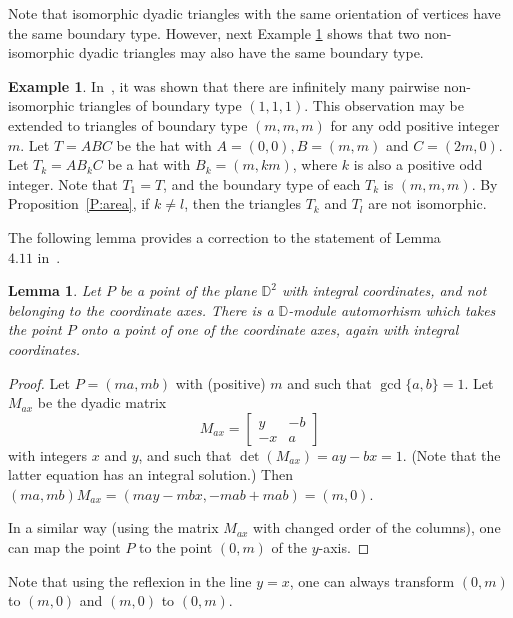 \documentclass[12pt]{amsart}
\def\mbD{\mathbb{D}}
\theoremstyle{plain}
\newtheorem{lemma}[theorem]{Lemma}
\theoremstyle{definition}
\newtheorem{example}[theorem]{Example}
\numberwithin{equation}{section}
\begin{document}
Note that isomorphic dyadic triangles with the same orientation of vertices have the same
boundary type. However, next
Example \ref{Ex:mmm0} shows that two non-isomorphic dyadic triangles may also have the same
boundary type.


\begin{example}\label{Ex:mmm0}
In~\cite[Prop.~4.7]{MRS11}, it was shown that there are infinitely many pairwise non-isomorphic
triangles of boundary type $(1,1,1)$. This observation may be extended to triangles of boundary
type $(m,m,m)$ for any odd positive integer $m$.
Let $T = ABC$ be the hat with $A = (0,0), B = (m,m)$ and $C = (2m,0)$. Let $T_k = AB_kC$ be a
hat with $B_k = (m,km)$, where $k$ is also a positive odd integer. Note that $T_1 = T$, and the
boundary type of each $T_k$ is $(m,m,m)$. By Proposition~\ref{P:area}, if $k \neq l$,
then the triangles $T_k$ and $T_l$ are not isomorphic.
\end{example}



The following lemma provides a correction to the statement of Lemma\\$4.11$ in~\cite{MRS11}.


\begin{lemma}\label{L:onaxis}
Let $P$ be a point of the plane $\mbD^2$ with integral coordinates, and not belonging to the
coordinate axes. There is a $\mbD$-module automorhism which takes the point $P$ onto a point of one of the coordinate axes, again with integral coordinates.
\end{lemma}
\begin{proof}
Let $P = (ma,mb)$ with (positive) $m$ and such that $\gcd\{a,b\} = 1$. Let $M_{ax}$ be the dyadic
matrix
\begin{equation}\label{E:Max}
M_{ax} =
\begin{bmatrix}
y & -b \\
-x & a
\end{bmatrix}
\end{equation}
with integers $x$ and $y$, and such that $ \det (M_{ax}) = ay - bx = 1$. (Note that the latter
equation has an integral solution.) Then $(ma,mb) M_{ax} = (may - mbx, -mab + mab) = (m,0)$.

In a similar way (using the matrix $M_{ax}$ with changed order of the columns), one can map the point $P$ to the point $(0,m)$ of the $y$-axis.
\end{proof}
\noindent  Note that using the reflexion
in the line $y = x$, one can always transform $(0,m)$ to $(m,0)$ and $(m,0)$ to $(0,m)$.
\end{document}
